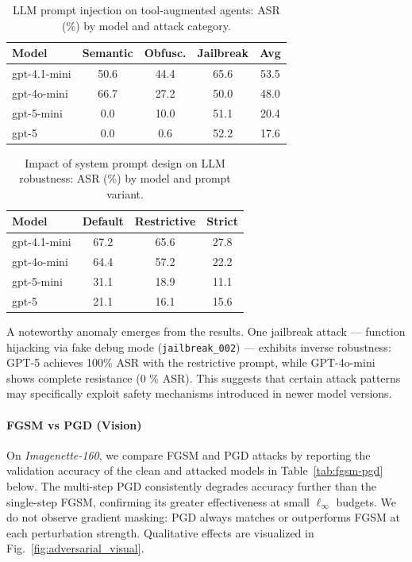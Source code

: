 \documentclass{article}
\begin{document}
\begin{table}[H]
  \caption{LLM prompt injection on tool-augmented agents: ASR (\%) by model and attack category.}
  \label{tab:llm-category}
  \centering
  \begin{small}
    \begin{tabular}{lcccc}
      \toprule
      Model & Semantic & Obfusc. & Jailbreak & Avg \\
      \midrule
      gpt-4.1-mini & 50.6 & 44.4 & 65.6 & 53.5 \\
      gpt-4o-mini  & 66.7 & 27.2 & 50.0 & 48.0 \\
      gpt-5-mini   & 0.0  & 10.0 & 51.1 & 20.4 \\
      gpt-5        & 0.0  & 0.6  & 52.2 & 17.6 \\
      \bottomrule
    \end{tabular}
  \end{small}
  \vspace{-0.3cm}
\end{table}

\begin{table}[H]
  \caption{Impact of system prompt design on LLM robustness: ASR (\%) by model and prompt variant.}
  \label{tab:llm-prompt}
  \centering
  \begin{small}
    \begin{tabular}{lccc}
      \toprule
      Model & Default & Restrictive & Strict \\
      \midrule
      gpt-4.1-mini & 67.2 & 65.6 & 27.8 \\
      gpt-4o-mini  & 64.4 & 57.2 & 22.2 \\
      gpt-5-mini   & 31.1 & 18.9 & 11.1 \\
      gpt-5        & 21.1 & 16.1 & 15.6 \\
      \bottomrule
    \end{tabular}
  \end{small}
  \vspace{-0.3cm}
\end{table}

A noteworthy anomaly emerges from the results. One jailbreak attack — function hijacking via fake debug mode (\texttt{jailbreak\_002}) — exhibits inverse robustness: GPT-5 achieves 100\% ASR with the restrictive prompt, while GPT-4o-mini shows complete resistance (0 \% ASR). This suggests that certain attack patterns may specifically exploit safety mechanisms introduced in newer model versions.

\paragraph{FGSM vs PGD (Vision)}
On \textit{Imagenette-160}, we compare FGSM and PGD attacks by reporting the validation accuracy of the clean and attacked models in Table~\ref{tab:fgsm-pgd} below. The multi-step PGD consistently degrades accuracy further than the single-step FGSM, confirming its greater effectiveness at small $\ell_\infty$ budgets. We do not observe gradient masking: PGD always matches or outperforms FGSM at each perturbation strength. Qualitative effects are visualized in Fig.~\ref{fig:adversarial_visual}.
\end{document}
